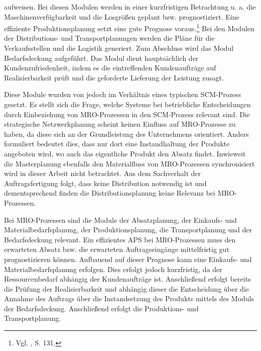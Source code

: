 aufweisen. Bei diesen Modulen werden in einer kurzfristigen Betrachtung u. a. die Maschinenverfügbarkeit und die Losgrößen geplant bzw. prognostiziert. Eine effiziente Produktionsplanung setzt eine gute Prognose voraus.\footnote{Vgl. \cite{dickersback2004pp}, S. 131.} Bei den Modulen der Distributions- und Transportplanungen werden die Pläne für die Verkaufsstellen und die Logistik generiert. Zum Abschluss wird das Modul Bedarfsdeckung aufgeführt. Das Modul dient hauptsächlich der Kundenzufriedenheit, indem es die eintreffenden Kundenaufträge auf Realisierbarkeit prüft und die geforderte Lieferung der Leistung zusagt.

Diese Module wurden von \cite{meyr2015structure} jedoch im Verhältnis eines typischen SCM-Prozess gesetzt. Es stellt sich die Frage, welche Systeme bei betriebliche Entscheidungen durch Einbeziehung von MRO-Prozessen in den SCM-Prozess relevant sind. Die strategische Netzwerkplanung scheint keinen Einfluss auf MRO-Prozesse zu haben, da diese sich an der Grundleistung des Unternehmens orientiert. Anders formuliert bedeutet dies, dass nur dort eine Instandhaltung der Produkte angeboten wird, wo auch das eigentliche Produkt den Absatz findet. Inwieweit die Masterplanung ebenfalls den Materialfluss von MRO-Prozessen synchronisiert wird in dieser Arbeit nicht betrachtet. Aus dem Sachverhalt der Auftragsfertigung folgt, dass keine Distribution notwendig ist und dementsprechend finden die Distributionsplanung keine Relevanz bei MRO-Prozessen.

Bei MRO-Prozessen sind die Module der Absatzplanung, der Einkaufs- und Materialbedarfsplanung, der Produktionsplanung, die Transportplanung und der Bedarfsdeckung relevant. Ein effizientes APS bei MRO-Prozessen muss den erwarteten Absatz bzw. die erwarteten Auftragseingänge mittelfristig gut prognostizieren können. Aufbauend auf dieser Prognose kann eine Einkaufs- und Materialbedarfsplanung erfolgen. Dies erfolgt jedoch kurzfristig, da der Ressourcenbedarf abhängig der Kundenaufträge ist. Anschließend erfolgt bereits die Prüfung der Realisierbarkeit und abhängig dieser die Entscheidung über die Annahme des Auftrags über die Instandsetzung des Produkts mittels des Moduls der Bedarfsdeckung. Anschließend erfolgt die Produktions- und Transportplanung.

